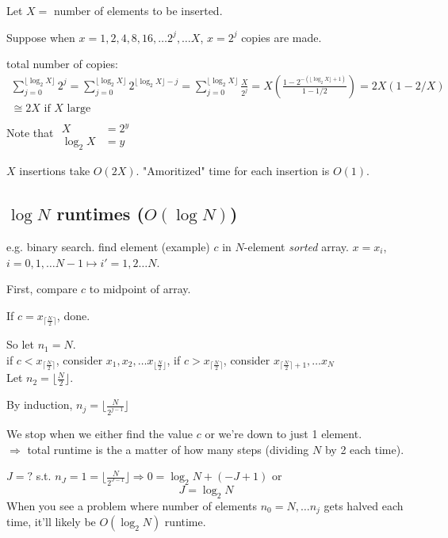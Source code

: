 \documentclass[10pt]{amsart}
\begin{document}
\begin{multicols*}{2}
Let $X = $ number of elements to be inserted. 

Suppose when $x=1, 2, 4, 8, 16, \dots 2^j, \dots X$, $x= 2^j$ copies are made. 

total number of copies:
\[
\begin{gathered}
\sum_{j=0}^{ \lfloor \log_2{X} \rfloor } 2^j = \sum_{j=0}^{ \lfloor \log_2{X} \rfloor } 2^{ \lfloor \log_2{X} \rfloor - j} = \sum_{j=0}^{ \lfloor \log_2{X} \rfloor } \frac{X}{2^j} = X\left( \frac{ 1 - 2^{ - (\lfloor \log_2{X} \rfloor  + 1)} }{ 1 - 1/2} \right) = 2X \left( 1 - 2/X \right) \\
\cong 2X \text{ if $X$ large } 
\end{gathered}
\]
Note that $\begin{aligned} & \quad \\ 
 X & = 2^y \\ 
 \log_2{X} & = y \end{aligned}$ 
 
 $X$ insertions take $O(2X)$.  "Amoritized" time for each insertion is $O(1)$.
 
\subsection{$\log{N}$ runtimes ($O(\log{N})$)} 

e.g. binary search. find element (example) $c$ in $N$-element \emph{sorted} array. $x= x_i$, $i=0,1, \dots N-1 \mapsto i' = 1, 2 \dots N$. 

First, compare $c$ to midpoint of array. 

If $c= x_{ \lceil \frac{N}{2} \rceil }$, done.

So let $n_1 =N$.  \\

if $c< x_{ \lceil \frac{N}{2} \rceil }$, consider $x_1, x_2, \dots x_{ \lfloor \frac{N}{2} \rfloor }$, if $c> x_{ \lceil \frac{N}{2} \rceil }$, consider $x_{ \lceil \frac{N}{2} \rceil + 1},  \dots x_N$ \\
 
Let $n_2= \lfloor \frac{N}{2} \rfloor$. 

By induction, $n_j = \lfloor \frac{N}{2^{j-1}} \rfloor$

We stop when we either find the value $c$ or we're down to just 1 element. \\
$\Longrightarrow $ total runtime is the a matter of how many steps (dividing $N$ by 2 each time).

$J = ?$ s.t. $n_J = 1 = \lfloor \frac{N}{2^{J-1}} \rfloor \Longrightarrow  0 = \log_2{N} + (-J + 1)$ or 
\[
J = \log_2{N}
\]
When you see a problem where number of elements $n_0 = N, \dots n_j$ gets halved each time, it'll likely be $O(\log_2{N})$ runtime. 


\end{multicols*}
\end{document}
